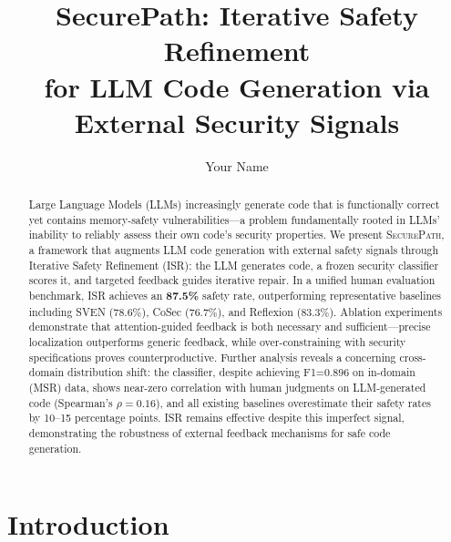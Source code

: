 \documentclass[sigconf,10pt]{acmart}
\begin{document}
\title{SecurePath: Iterative Safety Refinement\\for LLM Code Generation via External Security Signals}

\author{Your Name}

\begin{abstract}
Large Language Models (LLMs) increasingly generate code that is functionally correct yet contains memory-safety vulnerabilities---a problem fundamentally rooted in LLMs' inability to reliably assess their own code's security properties.
We present \textsc{SecurePath}, a framework that augments LLM code generation with external safety signals through Iterative Safety Refinement (ISR): the LLM generates code, a frozen security classifier scores it, and targeted feedback guides iterative repair.
%
In a unified human evaluation benchmark, ISR achieves an \textbf{87.5\%} safety rate, outperforming representative baselines including SVEN (78.6\%), CoSec (76.7\%), and Reflexion (83.3\%).
Ablation experiments demonstrate that attention-guided feedback is both necessary and sufficient---precise localization outperforms generic feedback, while over-constraining with security specifications proves counterproductive.
%
Further analysis reveals a concerning cross-domain distribution shift: the classifier, despite achieving F1=0.896 on in-domain (MSR) data, shows near-zero correlation with human judgments on LLM-generated code (Spearman's $\rho=0.16$), and all existing baselines overestimate their safety rates by 10--15 percentage points.
ISR remains effective despite this imperfect signal, demonstrating the robustness of external feedback mechanisms for safe code generation.
\end{abstract}

\maketitle

\section{Introduction}
\end{document}
